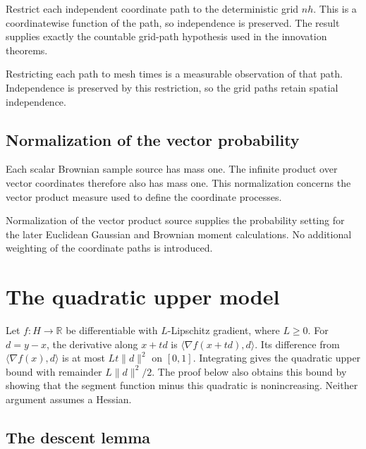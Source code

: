 \documentclass[11pt,a4paper]{report}
\begin{document}
Restrict each independent coordinate path to the deterministic grid \(nh\). This is a coordinatewise function of the path, so independence is preserved. The result supplies exactly the countable grid-path hypothesis used in the innovation theorems.



Restricting each path to mesh times is a measurable observation of that path. Independence is preserved by this restriction, so the grid paths retain spatial independence.

\subsection{\texorpdfstring{Normalization of the vector probability}{Normalization of the vector probability}}
\label{report-step-UnadjustedLangevin-CanonicalBrownian-lean-22}


Each scalar Brownian sample source has mass one. The infinite product over vector coordinates therefore also has mass one. This normalization concerns the vector product measure used to define the coordinate processes.



Normalization of the vector product source supplies the probability setting for the later Euclidean Gaussian and Brownian moment calculations. No additional weighting of the coordinate paths is introduced.

\section{\texorpdfstring{The quadratic upper model}{The quadratic upper model}}
\label{proof-module-UnadjustedLangevin-Analysis-Smooth-lean}


Let \(f:H\to\mathbb R\) be differentiable with \(L\)-Lipschitz gradient, where \(L\ge0\). For \(d=y-x\), the derivative along \(x+td\) is \(\langle\nabla f(x+td),d\rangle\). Its difference from \(\langle\nabla f(x),d\rangle\) is at most \(Lt\|d\|^2\) on \([0,1]\). Integrating gives the quadratic upper bound with remainder \(L\|d\|^2/2\). The proof below also obtains this bound by showing that the segment function minus this quadratic is nonincreasing. Neither argument assumes a Hessian.

\subsection{\texorpdfstring{The descent lemma}{The descent lemma}}
\label{report-step-UnadjustedLangevin-Analysis-Smooth-lean-1}
\end{document}
